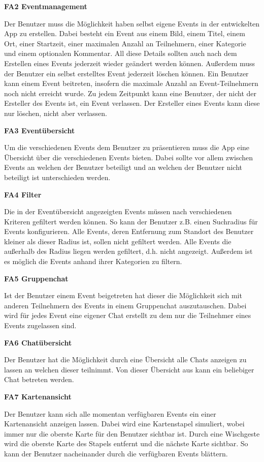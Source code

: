 \documentclass{scrartcl}
\begin{document}
\textbf{FA2 Eventmanagement}

Der Benutzer muss die Möglichkeit haben selbst eigene Events in der entwickelten
App zu erstellen. Dabei besteht ein Event aus einem Bild, einem Titel, einem
Ort, einer Startzeit, einer maximalen Anzahl an Teilnehmern, einer Kategorie und
einem optionalen Kommentar. All diese Details sollten auch nach dem Erstellen
eines Events jederzeit wieder geändert werden können. Außerdem muss der Benutzer
ein selbst erstelltes Event jederzeit löschen können. Ein Benutzer kann einem
Event beitreten, insofern die maximale Anzahl an Event-Teilnehmern noch nicht
erreicht wurde. Zu jedem Zeitpunkt kann eine Benutzer, der nicht der Ersteller
des Events ist, ein Event verlassen. Der Ersteller eines Events kann diese nur
löschen, nicht aber verlassen.

\textbf{FA3 Eventübersicht}

Um die verschiedenen Events dem Benutzer zu präsentieren muss die App eine
Übersicht über die verschiedenen Events bieten. Dabei sollte vor allem zwischen
Events an welchen der Benutzer beteiligt und an welchen der Benutzer nicht
beteiligt ist unterschieden werden.

\textbf{FA4 Filter}

Die in der Eventübersicht angezeigten Events müssen nach verschiedenen Kriteren
gefiltert werden können. So kann der Benutzer z.B. einen Suchradius für Events
konfigurieren. Alle Events, deren Entfernung zum Standort des Benutzer kleiner
als dieser Radius ist, sollen nicht gefiltert werden. Alle Events die außerhalb
des Radius liegen werden gefiltert, d.h. nicht angezeigt. Außerdem ist es
möglich die Events anhand ihrer Kategorien zu filtern.

\textbf{FA5 Gruppenchat}

Ist der Benutzer einem Event beigetreten hat dieser die Möglichkeit sich mit
anderen Teilnehmern des Events in einem Gruppenchat auszutauschen. Dabei wird
für jedes Event eine eigener Chat erstellt zu dem nur die Teilnehmer eines
Events zugelassen sind.

\textbf{FA6 Chatübersicht}

Der Benutzer hat die Möglichkeit durch eine Übersicht alle Chats anzeigen zu
lassen an welchen dieser teilnimmt. Von dieser Übersicht aus kann ein beliebiger
Chat betreten werden.

\textbf{FA7 Kartenansicht}

Der Benutzer kann sich alle momentan verfügbaren Events ein einer Kartenansicht
anzeigen lassen. Dabei wird eine Kartenstapel simuliert, wobei immer nur die
oberste Karte für den Benutzer sichtbar ist. Durch eine Wischgeste wird die
oberste Karte des Stapels entfernt und die nächste Karte sichtbar. So kann der
Benutzer nacheinander durch die verfügbaren Events blättern.
\end{document}
